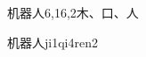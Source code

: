 \begin{entry}{机器人}{6,16,2}{⽊、⼝、⼈}
  \begin{phonetics}{机器人}{ji1qi4ren2}
  \end{phonetics}
\end{entry}
